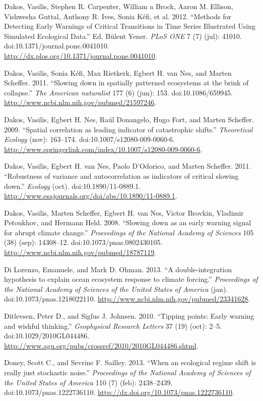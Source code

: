\documentclass[author-year, review]{elsarticle} %
\begin{document}
Dakos, Vasilis, Stephen R. Carpenter, William a Brock, Aaron M. Ellison,
Vishwesha Guttal, Anthony R. Ives, Sonia Kéfi, et al. 2012. ``Methods
for Detecting Early Warnings of Critical Transitions in Time Series
Illustrated Using Simulated Ecological Data.'' Ed. Bülent Yener.
\emph{PLoS ONE} 7 (7) (jul): 41010. doi:10.1371/journal.pone.0041010.
\url{http://dx.plos.org/10.1371/journal.pone.0041010}.

Dakos, Vasilis, Sonia Kéfi, Max Rietkerk, Egbert H. van Nes, and Marten
Scheffer. 2011. ``Slowing down in spatially patterned ecosystems at the
brink of collapse.'' \emph{The American naturalist} 177 (6) (jun): 153.
doi:10.1086/659945. \url{http://www.ncbi.nlm.nih.gov/pubmed/21597246}.

Dakos, Vasilis, Egbert H. Nes, Raúl Donangelo, Hugo Fort, and Marten
Scheffer. 2009. ``Spatial correlation as leading indicator of
catastrophic shifts.'' \emph{Theoretical Ecology} (nov): 163--174.
doi:10.1007/s12080-009-0060-6.
\url{http://www.springerlink.com/index/10.1007/s12080-009-0060-6}.

Dakos, Vasilis, Egbert H. van Nes, Paolo D'Odorico, and Marten Scheffer.
2011. ``Robustness of variance and autocorrelation as indicators of
critical slowing down.'' \emph{Ecology} (oct). doi:10.1890/11-0889.1.
\url{http://www.esajournals.org/doi/abs/10.1890/11-0889.1}.

Dakos, Vasilis, Marten Scheffer, Egbert H. van Nes, Victor Brovkin,
Vladimir Petoukhov, and Hermann Held. 2008. ``Slowing down as an early
warning signal for abrupt climate change.'' \emph{Proceedings of the
National Academy of Sciences} 105 (38) (sep): 14308--12.
doi:10.1073/pnas.0802430105.
\url{http://www.ncbi.nlm.nih.gov/pubmed/18787119}.

Di Lorenzo, Emanuele, and Mark D. Ohman. 2013. ``A double-integration
hypothesis to explain ocean ecosystem response to climate forcing.''
\emph{Proceedings of the National Academy of Sciences of the United
States of America} (jan). doi:10.1073/pnas.1218022110.
\url{http://www.ncbi.nlm.nih.gov/pubmed/23341628}.

Ditlevsen, Peter D., and Sigfus J. Johnsen. 2010. ``Tipping points:
Early warning and wishful thinking.'' \emph{Geophysical Research
Letters} 37 (19) (oct): 2--5. doi:10.1029/2010GL044486.
\url{http://www.agu.org/pubs/crossref/2010/2010GL044486.shtml}.

Doney, Scott C., and Sevrine F. Sailley. 2013. ``When an ecological
regime shift is really just stochastic noise.'' \emph{Proceedings of the
National Academy of Sciences of the United States of America} 110 (7)
(feb): 2438--2439. doi:10.1073/pnas.1222736110.
\url{http://dx.doi.org/10.1073/pnas.1222736110}.
\end{document}
